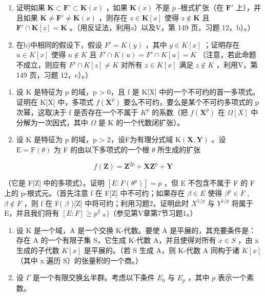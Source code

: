 \begin{enumerate}
\def\labelenumi{\alph{enumi})}
\setcounter{enumi}{1}
\item
  证明如果 \(\mathbf{K} \subset \mathbf{F}' \subset \mathbf{K}(x)\) ，如果 \(\mathbf{K}(x)\) 不是 \(p\) -根式扩张（在 \(\mathbf{F}'\) 上），并且如果 \(\mathbf{K} \neq \mathbf{F}' \neq \mathbf{K}(x)\) ，则存在 \(z \in \mathbf{K}[x]\) 使得 \(z \notin \mathbf{K}\) 且 \(\mathbf{F}' \cap \mathbf{K}[z] = \mathbf{K}\) 。（用反证法，利用a）以及V，第 149 页，习题 12，b）。）
\item
  在b)中相同的假设下，假设 \(F' = K(y)\) ，其中 \(y \in K[x]\) ；证明存在 \(u \in K[x]\) 使得 \(u \notin K\) 且 \(F' \cap K(u) = F' \cap K[u] = K\) （注意，若此命题不成立，则应有 \(F' \cap K[z] \neq K\) 对所有 \(z \in K[x]\) 满足 \(z \notin K\) ，利用V，第 149 页，习题 12，c）。）
\end{enumerate}

\begin{enumerate}
\def\labelenumi{\arabic{enumi})}
\setcounter{enumi}{1}
\item
  设 K 是特征为 p 的域，p \textgreater{} 0，且 f 是 K{[}X{]} 中的一个不可约的首一多项式。证明在 K{[}X{]} 中，多项式 \(f(\mathbf{X}^{p})\) 要么不可约，要么是某个不可约多项式的 p 次幂，这取决于 f 是否存在一个不属于 \(K^{p}\) 的系数（把 \(f(\mathbf{X}^{p})\) 在 \(\Omega[X]\) 中分解为一次因式，其中 \(\Omega\) 是 K 的一个代数闭扩张）。
\item
  设 K 是特征为 p 的域，p \textgreater{} 2，设F为有理分式域 \(\mathrm{K}(\mathbf{X}, \mathbf{Y})\) 。设 \(\mathrm{E} = \mathrm{F}(\theta)\) 为 F 的由以下多项式的一个根 \(\theta\) 所生成的扩张
\end{enumerate}

\[
f (\mathbf {Z}) = \mathbf {Z} ^ {2 p} + \mathbf {X Z} ^ {p} + \mathbf {Y}
\]

（它是 F{[}Z{]} 中的多项式）。证明 \([E:F(\theta^{p})]=p\) ，但 E 不包含不属于 F 的 F 上的 p-根式元。（首先注意 f 在 F{[}Z{]} 中不可约；如果存在 \(\beta\in E\) 使得 \(\beta^{p}\in F\) , \(\beta\notin F\) ，则 f 在 F( \(\beta\) ){[}Z{]} 中将可约；利用习题2，证明此时 \(X^{1/p}\) 与 \(Y^{1/p}\) 将属于 E，并且我们将有 \([E:F]\geqslant p^{2}\) 。)（参见第V章第7节习题1。）

\BourbakiExerciseGroup

\begin{enumerate}
\def\labelenumi{\arabic{enumi})}
\item
  设 K 是一个域，A 是一个交换 K-代数。要使 A 是平展的，其充要条件是：存在 A 的一个有限子集 S，它生成 K-代数 A，并且使得对所有 \(x \in S\) ，由 x 生成的子代数 \(K[x]\) 是平展的。（若 S 生成 A，则 K-代数 A 同构于诸 \(K[x]\) （其中 x 遍历 S）的张量积的一个商。）
\item
  设 \(\Gamma\) 是一个有限交换幺半群。考虑以下条件 \(E_0\) 与 \(E_p\) ，其中 \(p\) 表示一个素数。
\end{enumerate}

